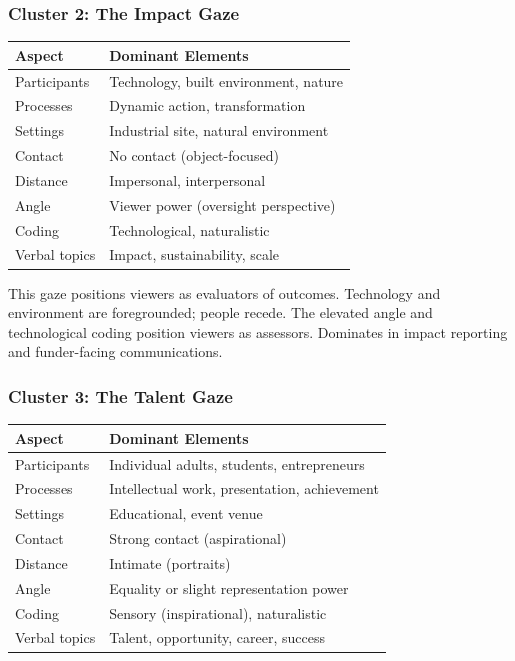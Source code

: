 \documentclass[../main.tex]{subfiles}
\begin{document}
\subsubsection{Cluster 2: The Impact Gaze}

\begin{center}
\small
\begin{tabular}{ll}
\toprule
\textbf{Aspect} & \textbf{Dominant Elements} \\
\midrule
Participants & Technology, built environment, nature \\
Processes & Dynamic action, transformation \\
Settings & Industrial site, natural environment \\
Contact & No contact (object-focused) \\
Distance & Impersonal, interpersonal \\
Angle & Viewer power (oversight perspective) \\
Coding & Technological, naturalistic \\
Verbal topics & Impact, sustainability, scale \\
\bottomrule
\end{tabular}
\end{center}

This gaze positions viewers as evaluators of outcomes. Technology and environment are foregrounded; people recede. The elevated angle and technological coding position viewers as assessors. Dominates in impact reporting and funder-facing communications.

\subsubsection{Cluster 3: The Talent Gaze}

\begin{center}
\small
\begin{tabular}{ll}
\toprule
\textbf{Aspect} & \textbf{Dominant Elements} \\
\midrule
Participants & Individual adults, students, entrepreneurs \\
Processes & Intellectual work, presentation, achievement \\
Settings & Educational, event venue \\
Contact & Strong contact (aspirational) \\
Distance & Intimate (portraits) \\
Angle & Equality or slight representation power \\
Coding & Sensory (inspirational), naturalistic \\
Verbal topics & Talent, opportunity, career, success \\
\bottomrule
\end{tabular}
\end{center}
\end{document}

